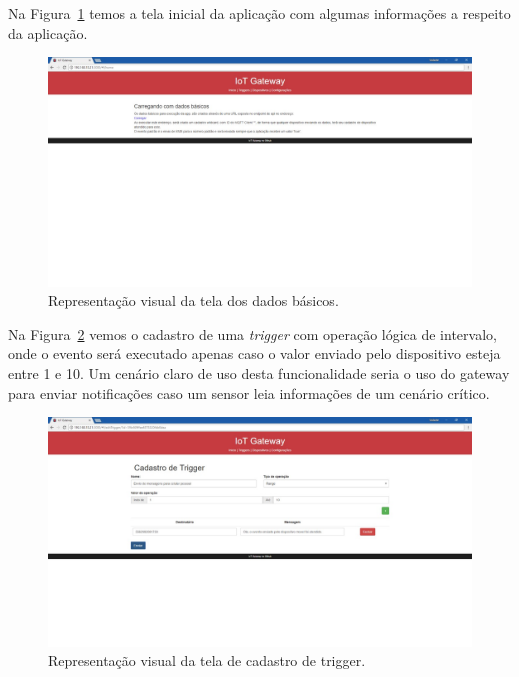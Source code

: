 Na Figura~\ref{fig:dadosBasicos} temos a tela inicial da aplicação com algumas informações a respeito da aplicação.
\begin{figure}[h!]
	\begin{center}
		\includegraphics[width=1.085\textwidth]{./img/dadosBasicos}
		\caption{Representação visual da tela dos dados básicos.}
		\label{fig:dadosBasicos}
	\end{center}
\end{figure}

Na Figura~\ref{fig:triggerCadastrada} vemos o cadastro de uma \textit{trigger} com operação lógica de intervalo, onde o evento será executado apenas caso o valor enviado pelo dispositivo esteja entre 1 e 10. Um cenário claro de uso desta funcionalidade seria o uso do gateway para enviar notificações caso um sensor leia informações de um cenário crítico.
\begin{figure}[h!]
	\begin{center}
		\includegraphics[width=1.085\textwidth]{./img/triggerCadastrada}
		\caption{Representação visual da tela de cadastro de trigger.}
		\label{fig:triggerCadastrada}
	\end{center}
\end{figure}

